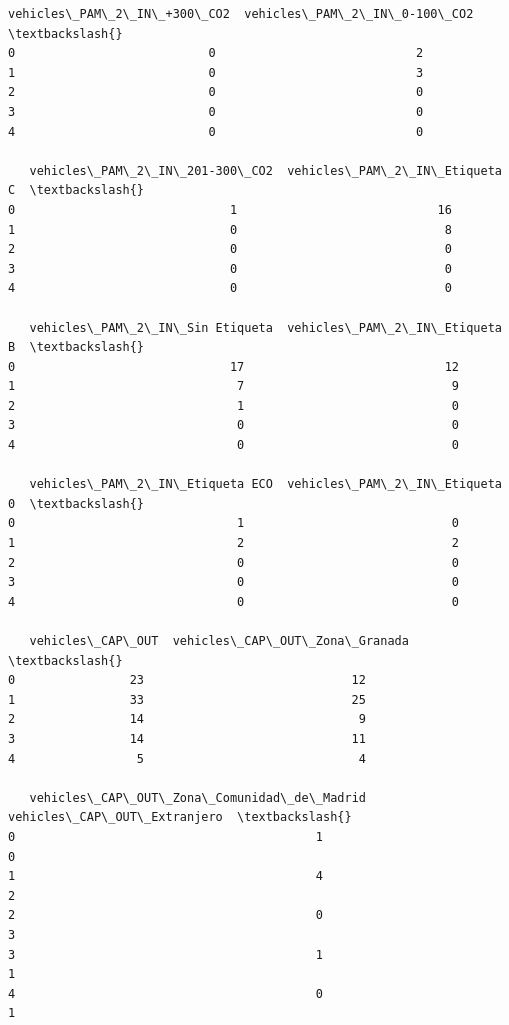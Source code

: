\documentclass[11pt]{article}
\begin{document}
\begin{tcolorbox}[breakable, size=fbox, boxrule=.5pt, pad at break*=1mm, opacityfill=0]
\begin{Verbatim}[commandchars=\\\{\}]
   vehicles\_PAM\_2\_IN\_+300\_CO2  vehicles\_PAM\_2\_IN\_0-100\_CO2  \textbackslash{}
0                           0                            2
1                           0                            3
2                           0                            0
3                           0                            0
4                           0                            0

   vehicles\_PAM\_2\_IN\_201-300\_CO2  vehicles\_PAM\_2\_IN\_Etiqueta C  \textbackslash{}
0                              1                            16
1                              0                             8
2                              0                             0
3                              0                             0
4                              0                             0

   vehicles\_PAM\_2\_IN\_Sin Etiqueta  vehicles\_PAM\_2\_IN\_Etiqueta B  \textbackslash{}
0                              17                            12
1                               7                             9
2                               1                             0
3                               0                             0
4                               0                             0

   vehicles\_PAM\_2\_IN\_Etiqueta ECO  vehicles\_PAM\_2\_IN\_Etiqueta 0  \textbackslash{}
0                               1                             0
1                               2                             2
2                               0                             0
3                               0                             0
4                               0                             0

   vehicles\_CAP\_OUT  vehicles\_CAP\_OUT\_Zona\_Granada  \textbackslash{}
0                23                             12
1                33                             25
2                14                              9
3                14                             11
4                 5                              4

   vehicles\_CAP\_OUT\_Zona\_Comunidad\_de\_Madrid  vehicles\_CAP\_OUT\_Extranjero  \textbackslash{}
0                                          1                            0
1                                          4                            2
2                                          0                            3
3                                          1                            1
4                                          0                            1


\end{Verbatim}
\end{tcolorbox}
\end{document}
